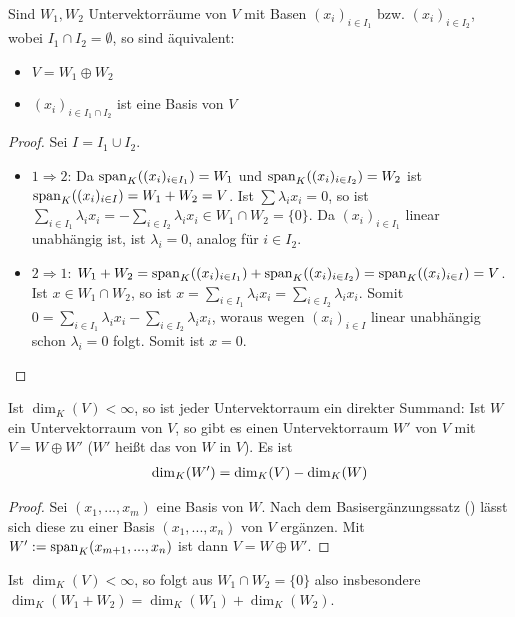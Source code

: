 \begin{proposition}
	Sind $W_1,W_2$ Untervektorräume von $V$ mit Basen $(x_i)_{i\in I_1}$ bzw. $(x_i)_{i\in I_2}$, wobei $I_1 \cap 
	I_2 = \emptyset$, so sind äquivalent:
	\begin{itemize}
		\item $V=W_1 \oplus W_2$
		\item $(x_i)_{i\in I_1 \cap I_2}$ ist eine Basis von $V$
	\end{itemize}
\end{proposition}
\begin{proof}
	Sei $I=I_1 \cup I_2$.
	\begin{itemize}
		\item $1\Rightarrow 2$: Da $\operatorname{span}_K((x_i)_{i\in I_1})=W_1$ und $\operatorname{span}_K((x_i)_{i\in I_2})=W_2$ ist $\operatorname{span}_K((x_i)
		_{i\in I})=W_1+W_2=V$. Ist $\sum \lambda_ix_i=0$, so ist $\sum_{i\in I_1} \lambda_ix_i = -\sum
		_{i\in I_2} \lambda_ix_i \in W_1 \cap W_2 = \{0\}$. Da $(x_i)_{i\in I_1}$ linear unabhängig ist, ist 
		$\lambda_i=0$, analog für $i\in I_2$.
		\item $2\Rightarrow 1$: $W_1+W_2=\operatorname{span}_K((x_i)_{i\in I_1})+\operatorname{span}_K((x_i)_{i\in I_2})=\operatorname{span}_K((x_i)_{i\in I})=V$. Ist 
		$x\in W_1 \cap W_2$, so ist $x=\sum_{i\in I_1} \lambda_ix_i = \sum_{i\in I_2} \lambda_ix_i$. Somit 
		$0=\sum_{i\in I_1} \lambda_ix_i - \sum_{i\in I_2} \lambda_ix_i$, woraus wegen $(x_i)_{i\in I}$ 
		linear unabhängig schon $\lambda_i=0$ folgt. Somit ist $x=0$.
	\end{itemize}
\end{proof}

\begin{conclusion}
	Ist $\dim_K(V)<\infty$, so ist jeder Untervektorraum ein direkter Summand: Ist $W$ ein Untervektorraum von $V$, so 
	gibt es einen Untervektorraum $W'$ von $V$ mit $V=W\oplus W'$ ($W'$ heißt das  von $W$ in $V$). Es 
	ist
	\begin{align}
		\dim_K(W')=\dim_K(V)-\dim_K(W)\notag
	\end{align}
\end{conclusion}
\begin{proof}
	Sei $(x_1,...,x_m)$ eine Basis von $W$. Nach dem Basisergänzungssatz () lässt sich diese zu einer Basis $(x_1,...,x_n)$ 
	von $V$ ergänzen. Mit $W':= \operatorname{span}_K(x_{m+1},...,x_n)$ ist dann $V=W\oplus W'$.
\end{proof}

\begin{remark}
	Ist $\dim_K(V)<\infty$, so folgt aus $W_1\cap W_2=\{0\}$ also insbesondere $\dim_K(W_1+W_2)=
	\dim_K(W_1)+\dim_K(W_2)$. 
\end{remark}

